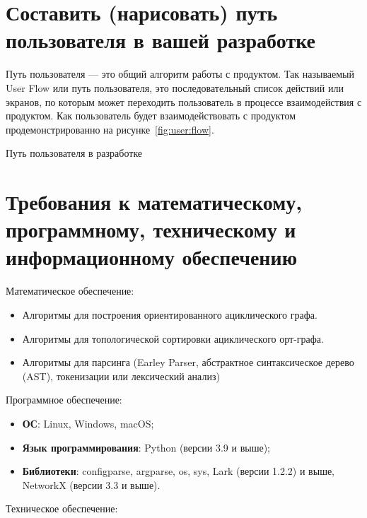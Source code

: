 \section{Составить (нарисовать) путь пользователя в вашей разработке}

Путь пользователя --- это общий алгоритм работы с продуктом. Так
называемый User Flow или путь пользователя, это последовательный
список действий или экранов, по которым может переходить
пользователь в процессе взаимодействия с продуктом.
Как пользователь будет взаимодействовать с продуктом
продемонстрированно на рисунке~\ref{fig:user:flow}.

\begin{image}
	\caption{Путь пользователя в разработке}
	\label{fig:user:flow}
\end{image}

\section{Требования к математическому, программному,
	техническому и информационному обеспечению}

Математическое обеспечение:

\begin{itemize}
	\item Алгоритмы для построения ориентированного ациклического графа.
	\item Алгоритмы для топологической сортировки ациклического орт-графа.
	\item Алгоритмы для парсинга
		(Earley Parser, абстрактное синтаксическое дерево (AST),
		токенизации или лексический анализ)
\end{itemize}

Программное обеспечение:

\begin{itemize}
	\item \textbf{ОС}: Linux, Windows, macOS;
	\item \textbf{Язык программирования}: Python (версии 3.9 и выше);
	\item \textbf{Библиотеки}: configparse, argparse, os, sys,
		Lark (версии 1.2.2) и выше, NetworkX (версии 3.3 и выше).
\end{itemize}

Техническое обеспечение:

